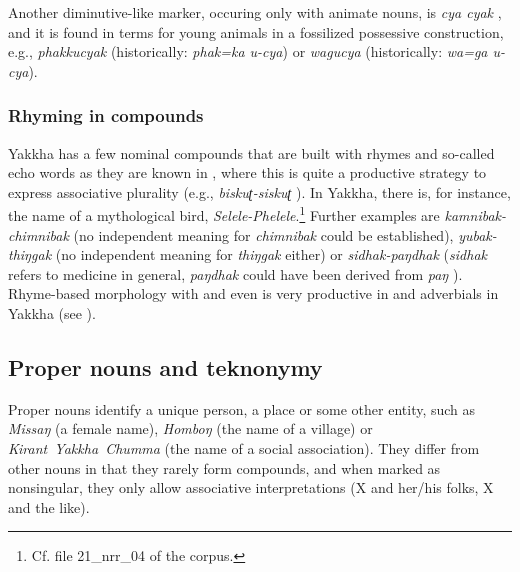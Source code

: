 Another diminutive-like marker, occuring only with animate nouns, is \emph{cya \ti cyak} , and it is found in terms for young animals in a fossilized possessive construction, e.g., \emph{phakkucyak}   (historically: \emph{phak=ka u-cya}) or \emph{wagucya}  (historically: \emph{wa=ga u-cya}).

\subsubsection{Rhyming in compounds}

 Yakkha has a few nominal compounds that are built with rhymes and so-called echo words as they are known in , where this is quite a productive strategy to express associative plurality (e.g., \emph{biskuʈ-siskuʈ} ). In Yakkha, there is, for instance, the  name of a mythological bird, \emph{Selele-Phelele}.\footnote{Cf. file 21\_nrr\_04 of the corpus.} Further examples are \emph{kamnibak-chimnibak}  (no independent meaning for \emph{chimnibak} could be  established), \emph{yubak-thiŋgak}  (no independent meaning for \emph{thiŋgak} either) or \emph{sidhak-paŋdhak}  (\emph{sidhak} refers to medicine in general, \emph{paŋdhak} could have been derived from \emph{paŋ} ). Rhyme-based morphology with   and even  is very productive in  and adverbials in Yakkha (see ).



\subsection{Proper nouns and teknonymy}
 
 Proper nouns identify a unique person, a place or some other entity, such as \emph{Missaŋ} (a female name), \emph{Homboŋ} (the name of a village) or \mbox{\emph{Kirant Yakkha Chumma}} (the name of a social association). They differ from other nouns in that they rarely form compounds, and when marked as nonsingular, they only allow associative interpretations (X and her/his folks, X and the like). 
 

